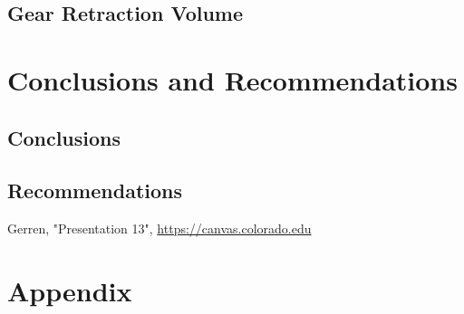 \documentclass[conf]{new-aiaa}
\begin{document}
\subsection{Gear Retraction Volume}

\section{Conclusions and Recommendations}
\subsection{Conclusions}

\subsection{Recommendations}

\begin{thebibliography}{99}


 Gerren, "Presentation 13", \url{https://canvas.colorado.edu}

\end{thebibliography}

\section{Appendix}
\end{document}
